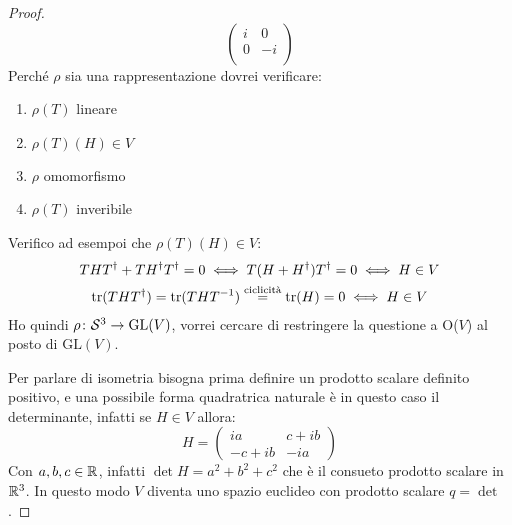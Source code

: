 \begin{proof}
\[\begin{pmatrix}
      i & 0 \\
      0 & -i \\
    \end{pmatrix}
  \]
  Perché $ \rho $ sia una rappresentazione dovrei verificare:
  \begin{enumerate}
  \item $ \rho(T) $ lineare
  \item $ \rho(T)(H) \in V $
  \item $ \rho $ omomorfismo
  \item $ \rho(T) $ inveribile
  \end{enumerate}
  Verifico ad esempoi che $ \rho(T)(H) \in V $:
  \begin{gather*}
    THT^\dagger + TH^\dagger T^\dagger = 0 \iff T(H + H^\dagger)T^\dagger = 0 \iff H \in V \\
    \mathrm{tr}(THT^\dagger) = \mathrm{tr}(THT^{-1}) \overset{\text{ciclicità}}{=} \mathrm{tr}(H) = 0 \iff H \in V
  \end{gather*}
  Ho quindi $ \rho \colon \mathcal{S}^{3} \to \mathrm{GL}(V) $, vorrei cercare di restringere
  la questione a O($ V $) al posto di $ \mathrm{GL}(V) $.

  Per parlare di isometria bisogna prima definire un prodotto scalare definito
  positivo, e una possibile forma quadratrica naturale è in questo caso il determinante, infatti
  se $ H \in V $ allora:
  \[
    H =
    \begin{pmatrix}
      i a & c + i b \\
      -c + i b & - i a
    \end{pmatrix}
  \]
  Con $ a,b,c \in \mathbb{R}^{} $, infatti $ \det{H} = a^2 + b^2 + c^2 $ che è il consueto
  prodotto scalare in $ \mathbb{R}^{3} $. In questo modo $ V $ diventa uno spazio euclideo
  con prodotto scalare $ q = \det $.


\end{proof}
